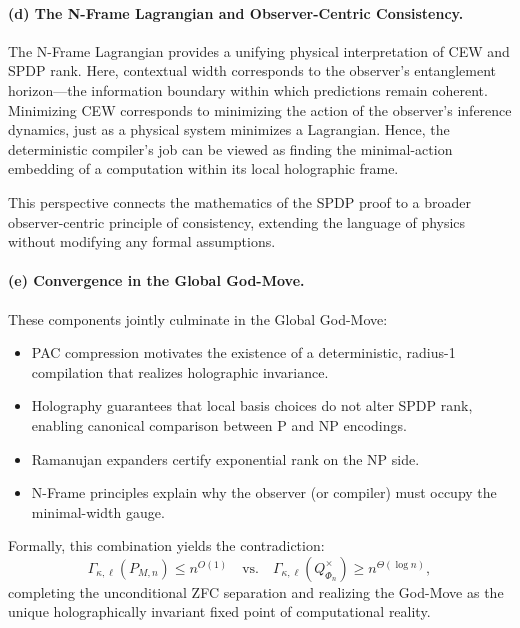 \documentclass[12pt]{article}
\theoremstyle{definition}
\theoremstyle{definition}
\theoremstyle{remark}
\theoremstyle{remark}
\begin{document}
\paragraph{(d) The N-Frame Lagrangian and Observer-Centric Consistency.}

The N-Frame Lagrangian provides a unifying physical interpretation of CEW and SPDP rank.
Here, contextual width corresponds to the observer's entanglement horizon---the information boundary within which predictions remain coherent.
Minimizing CEW corresponds to minimizing the action of the observer's inference dynamics, just as a physical system minimizes a Lagrangian.
Hence, the deterministic compiler's job can be viewed as finding the minimal-action embedding of a computation within its local holographic frame.

This perspective connects the mathematics of the SPDP proof to a broader observer-centric principle of consistency, extending the language of physics without modifying any formal assumptions.

\paragraph{(e) Convergence in the Global God-Move.}

These components jointly culminate in the Global God-Move:

\begin{itemize}
\item PAC compression motivates the existence of a deterministic, radius-1 compilation that realizes holographic invariance.

\item Holography guarantees that local basis choices do not alter SPDP rank, enabling canonical comparison between P and NP encodings.

\item Ramanujan expanders certify exponential rank on the NP side.

\item N-Frame principles explain why the observer (or compiler) must occupy the minimal-width gauge.
\end{itemize}

Formally, this combination yields the contradiction:
\[
\Gamma_{\kappa,\ell}(P_{M,n}) \leq n^{O(1)} \quad\text{vs.}\quad \Gamma_{\kappa,\ell}(Q^{\times}_{\Phi_n}) \geq n^{\Theta(\log n)},
\]
completing the unconditional ZFC separation and realizing the God-Move as the unique holographically invariant fixed point of computational reality.
\end{document}
